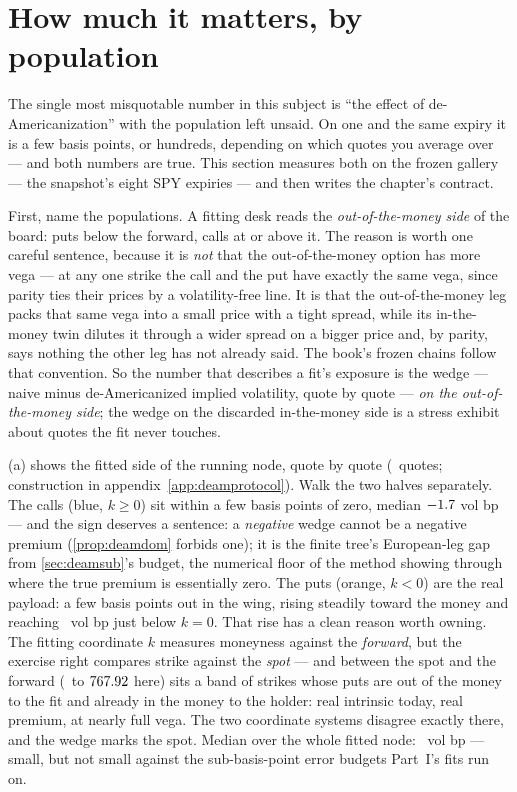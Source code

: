 \section{How much it matters, by population}
\label{sec:deammatters}

The single most misquotable number in this subject is ``the effect of
de-Americanization'' with the population left unsaid.  On one and the
same expiry it is a few basis points, or hundreds, depending on which
quotes you average over --- and both numbers are true.  This section
measures both on the frozen gallery --- the snapshot's eight SPY
expiries --- and then writes the chapter's contract.

First, name the populations.  A fitting desk reads the
\emph{out-of-the-money side} of the board: puts below the forward,
calls at or above it.  The reason is worth one careful sentence,
because it is \emph{not} that the out-of-the-money option has more
vega --- at any one strike the call and the put have exactly the same
vega, since parity ties their prices by a volatility-free line.  It
is that the out-of-the-money leg packs that same vega into a small
price with a tight spread, while its in-the-money twin dilutes it
through a wider spread on a bigger price and, by parity, says nothing
the other leg has not already said.  The book's frozen chains follow
that convention.  So the
number that describes a fit's exposure is the wedge --- naive minus
de-Americanized implied volatility, quote by quote --- \emph{on the
out-of-the-money side}; the wedge on the discarded in-the-money side
is a stress exhibit about quotes the fit never touches.

(a) shows the fitted side of the running node,
quote by quote (\MacDeamGalSelN\ quotes; construction in
appendix~\ref{app:deamprotocol}).  Walk the two halves separately.
The calls (blue, $k\ge0$) sit within a few basis points of zero,
median $-1.7$ vol bp --- and the sign deserves
a sentence: a \emph{negative} wedge cannot be a negative premium
(\cref{prop:deamdom} forbids one); it is the finite tree's
European-leg gap from \cref{sec:deamsub}'s budget, the numerical
floor of the method showing through where the true premium is
essentially zero.  The puts (orange, $k<0$) are the real payload:
a few basis points out in the wing, rising steadily toward the money
and reaching \MacDeamGalSelMaxBp\ vol bp just below $k=0$.  That
rise has a clean reason worth owning.  The fitting coordinate $k$
measures moneyness against the \emph{forward}, but the exercise
right compares strike against the \emph{spot} --- and between the
spot and the forward (\MacFwdLineSpotDollars\ to
$767.92$ here) sits a band of strikes whose puts are
out of the money to the fit and already in the money to the holder:
real intrinsic today, real premium, at nearly full vega.  The two
coordinate systems disagree exactly there, and the wedge marks the
spot.  Median over the whole fitted node:
\MacDeamGalSelMedianBp\ vol bp --- small, but not small against the
sub-basis-point error budgets Part~I's fits run on.

